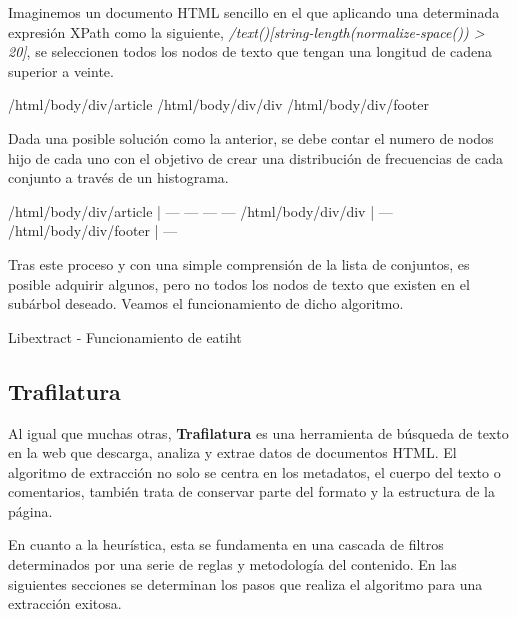 Imaginemos un documento HTML sencillo en el que aplicando una determinada expresión XPath como la siguiente,
\emph{/text()[string-length(normalize-space()) > 20]}, se seleccionen todos los nodos de texto que tengan 
una longitud de cadena superior a veinte.

\begin{Schunk}
  \begin{Soutput}
    /html/body/div/article
    /html/body/div/div
    /html/body/div/footer
  \end{Soutput}
\end{Schunk}

Dada una posible solución como la anterior, se debe contar el numero de nodos hijo de cada uno con el 
objetivo de crear una distribución de frecuencias de cada conjunto a través de un histograma.

\begin{Schunk}
  \begin{Soutput}
    /html/body/div/article   | — — — —
    /html/body/div/div       | —
    /html/body/div/footer    | —
  \end{Soutput}
\end{Schunk}

Tras este proceso y con una simple comprensión de la lista de conjuntos, es posible adquirir algunos, pero 
no todos los nodos de texto que existen en el subárbol deseado. Veamos el funcionamiento de dicho algoritmo.

\begin{codefloat}
  
  \caption{Libextract - Funcionamiento de eatiht}
  \label{cod:libextract - funcionamiento de eatiht}
\end{codefloat}

\subsection{Trafilatura}
\label{subsec:trafilatura}

Al igual que muchas otras, \textbf{Trafilatura} \cite{trafilatura} es una herramienta de búsqueda de texto
en la web que descarga, analiza y extrae datos de documentos HTML. El algoritmo de extracción no solo se
centra en los metadatos, el cuerpo del texto o comentarios, también trata de conservar parte del formato
y la estructura de la página.

En cuanto a la heurística, esta se fundamenta en una cascada de filtros determinados por una serie de 
reglas y metodología del contenido. En las siguientes secciones se determinan los pasos que realiza el
algoritmo para una extracción exitosa.

